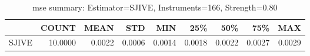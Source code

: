 \begin{table}[ht]
\centering
\caption{mse summary: Estimator=SJIVE, Instruments=166, Strength=0.80}
\begin{tabular}{lrrrrrrrr}
\toprule
 & COUNT & MEAN & STD & MIN & 25\% & 50\% & 75\% & MAX \\
\midrule
SJIVE & 10.0000 & 0.0022 & 0.0006 & 0.0014 & 0.0018 & 0.0022 & 0.0027 & 0.0029 \\
\bottomrule
\end{tabular}
\end{table}
